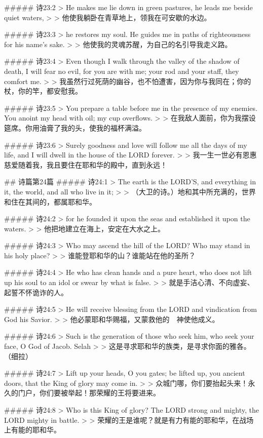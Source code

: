 ##### 诗23:2
> He makes me lie down in green pastures, he leads me beside quiet waters,
>
> 他使我躺卧在青草地上，领我在可安歇的水边。


##### 诗23:3
> he restores my soul. He guides me in paths of righteousness for his name's sake.
>
> 他使我的灵魂苏醒，为自己的名引导我走义路。


##### 诗23:4
> Even though I walk through the valley of the shadow of death, I will fear no evil, for you are with me; your rod and your staff, they comfort me.
>
> 我虽然行过死荫的幽谷，也不怕遭害，因为你与我同在；你的杖，你的竿，都安慰我。


##### 诗23:5
> You prepare a table before me in the presence of my enemies. You anoint my head with oil; my cup overflows.
>
> 在我敌人面前，你为我摆设筵席。你用油膏了我的头，使我的福杯满溢。


##### 诗23:6
> Surely goodness and love will follow me all the days of my life, and I will dwell in the house of the LORD forever.
>
> 我一生一世必有恩惠慈爱随着我，我且要住在耶和华的殿中，直到永远！


## 诗篇第24篇
##### 诗24:1
> The earth is the LORD'S, and everything in it, the world, and all who live in it;
>
> （大卫的诗。）地和其中所充满的，世界和住在其间的，都属耶和华。


##### 诗24:2
> for he founded it upon the seas and established it upon the waters.
>
> 他把地建立在海上，安定在大水之上。


##### 诗24:3
> Who may ascend the hill of the LORD? Who may stand in his holy place?
>
> 谁能登耶和华的山？谁能站在他的圣所？


##### 诗24:4
> He who has clean hands and a pure heart, who does not lift up his soul to an idol or swear by what is false.
>
> 就是手洁心清、不向虚妄、起誓不怀诡诈的人。


##### 诗24:5
> He will receive blessing from the LORD and vindication from God his Savior.
>
> 他必蒙耶和华赐福，又蒙救他的　神使他成义。


##### 诗24:6
> Such is the generation of those who seek him, who seek your face, O God of Jacob. Selah
>
> 这是寻求耶和华的族类，是寻求你面的雅各。（细拉）


##### 诗24:7
> Lift up your heads, O you gates; be lifted up, you ancient doors, that the King of glory may come in.
>
> 众城门哪，你们要抬起头来！永久的门户，你们要被举起！那荣耀的王将要进来。


##### 诗24:8
> Who is this King of glory? The LORD strong and mighty, the LORD mighty in battle.
>
> 荣耀的王是谁呢？就是有力有能的耶和华，在战场上有能的耶和华。


